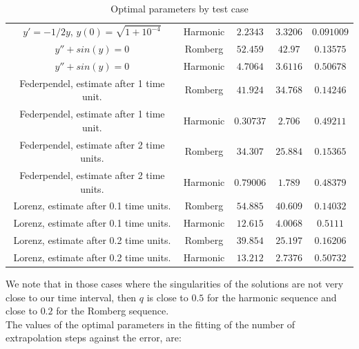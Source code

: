 \begin{table}[H]
\begin{tabular}{c|c||c|c|c}
$y' = -1/2y$, $y(0) = \sqrt{1+10^{-4}}$ & Harmonic & \(2.2343\) & \(3.3206\) & \(0.091009\)\\
$y'' + sin(y) = 0$ & Romberg & \(52.459\) & \(42.97\) & \(0.13575\)\\
$y'' + sin(y) = 0$ & Harmonic & \(4.7064\) & \(3.6116\) & \(0.50678\)\\
Federpendel, estimate after 1 time unit. & Romberg & \(41.924\) & \(34.768\) & \(0.14246\)\\
Federpendel, estimate after 1 time unit. & Harmonic & \(0.30737\) & \(2.706\) & \(0.49211\)\\
Federpendel, estimate after 2 time units. & Romberg & \(34.307\) & \(25.884\) & \(0.15365\) \\
Federpendel, estimate after 2 time units. & Harmonic & \(0.79006\) & \(1.789\) & \(0.48379\) \\
Lorenz, estimate after 0.1 time units. & Romberg & \(54.885\) & \(40.609\) & \(0.14032\)\\
Lorenz, estimate after 0.1 time units. & Harmonic & \(12.615\) & \(4.0068\) & \(0.5111\) \\
Lorenz, estimate after 0.2 time units. & Romberg & \(39.854\) & \(25.197\) & \(0.16206\)  \\
Lorenz, estimate after 0.2 time units. & Harmonic & \(13.212\) & \(2.7376\) & \(0.50732\)\\
    \end{tabular}
    \caption{Optimal parameters by test case}
    \label{tab:my_label}
\end{table}

We note that in those cases where the singularities of the solutions are not very close to our time interval, then \(q\) is close to \(0.5\) for the harmonic sequence and close to \(0.2\) for the Romberg sequence.\\

The values of the optimal parameters in the fitting of the number of extrapolation steps against the error, are:

